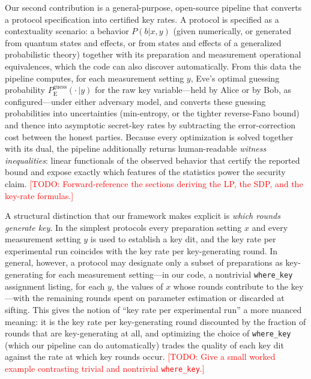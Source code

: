 \documentclass[aps,pra,twocolumn,superscriptaddress,longbibliography,nofootinbib]{revtex4-2}
\newcommand{\Eve}{\mathrm{E}}
\newcommand{\pguess}{P_{\Eve}^{\mathrm{guess}}}
\newcommand{\wherekey}{\texttt{where\_key}}
\newcommand{\todo}[1]{\textcolor{red}{[TODO: #1]}}
\begin{document}
Our second contribution is a general-purpose, open-source pipeline that
converts a protocol specification into certified key rates. A protocol
is specified as a contextuality scenario: a behavior $P(b|x,y)$ (given
numerically, or generated from quantum states and effects, or from
states and effects of a generalized probabilistic theory) together with
its preparation and measurement operational equivalences, which the code
can also discover automatically. From this data the pipeline computes,
for each measurement setting $y$, Eve's optimal guessing probability
$\pguess(\cdot\,|y)$ for the raw key variable---held by Alice or by Bob,
as configured---under either adversary model, and converts these
guessing probabilities into uncertainties (min-entropy, or the tighter
reverse-Fano bound) and thence into asymptotic secret-key rates by
subtracting the error-correction cost between the honest parties.
Because every optimization is solved together with its dual, the
pipeline additionally returns human-readable \emph{witness
inequalities}: linear functionals of the observed behavior that certify
the reported bound and expose exactly which features of the statistics
power the security claim. \todo{Forward-reference the sections deriving
the LP, the SDP, and the key-rate formulas.}

A structural distinction that our framework makes explicit is
\emph{which rounds generate key}. In the simplest protocols every
preparation setting $x$ and every measurement setting $y$ is used to
establish a key dit, and the key rate per experimental run coincides
with the key rate per key-generating round. In general, however, a
protocol may designate only a subset of preparations as key-generating
for each measurement setting---in our code, a nontrivial \wherekey{}
assignment listing, for each $y$, the values of $x$ whose rounds
contribute to the key---with the remaining rounds spent on parameter
estimation or discarded at sifting. This gives the notion of ``key rate
per experimental run'' a more nuanced meaning: it is the key rate per
key-generating round discounted by the fraction of rounds that are
key-generating at all, and optimizing the choice of \wherekey{} (which
our pipeline can do automatically) trades the quality of each key dit
against the rate at which key rounds occur. \todo{Give a small worked
example contrasting trivial and nontrivial \wherekey{}.}
\end{document}
